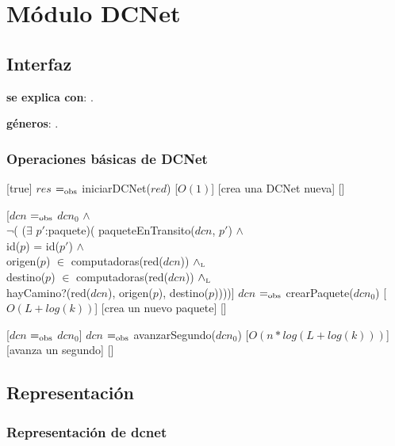 \section{Módulo DCNet}

\subsection{Interfaz}

\textbf{se explica con}: .

\textbf{géneros}: .

\subsubsection{Operaciones básicas de DCNet}

[true]
{$res$ $=_{\mathrm{obs}}$ iniciarDCNet($red$)}
[$O(1)$]
[crea una DCNet nueva]
[]
~

[$dcn$ $=_{\mathrm{obs}}$ $dcn_0$ $\land$ \\
$\neg$( ($\exists$ $p'$:paquete)(	paqueteEnTransito($dcn$, $p'$) $\land$ \\
									id($p$) = id($p'$) $\land$ \\
									origen($p$) $\in$ computadoras(red($dcn$)) $\land_{\mathrm{\scriptscriptstyle{L}}}$ \\
									destino($p$) $\in$ computadoras(red($dcn$)) $\land_{\mathrm{\scriptscriptstyle{L}}}$ \\
									hayCamino?(red($dcn$), origen($p$), destino($p$))))]
{$dcn$ $=_{\mathrm{obs}}$ crearPaquete($dcn_0$)}
[$O(L + log(k))$]
[crea un nuevo paquete]
[]
~

[$dcn$ $=_{\mathrm{obs}}$ $dcn_0$]
{$dcn$ $=_{\mathrm{obs}}$ avanzarSegundo($dcn_0$)}
[$O(n * log(L + log(k)))$]
[avanza un segundo]
[]
~

\subsection{Representación}

\subsubsection{Representación de dcnet}

